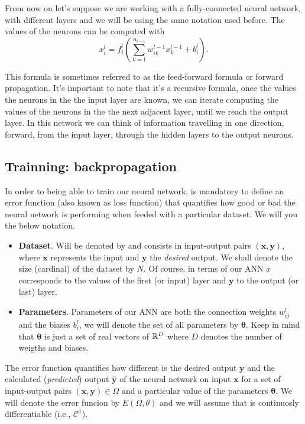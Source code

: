 From now on let's suppose we are working with a fully-connected neural network,
with different layers and we will be using the same notation used before. The
values of the neurons can be computed with
\begin{equation}
  x_i^l = f_i^l \left( \sum_{k=1}^{n_{l-1}} w_{ik}^{l-1} x_{k}^{l-1} + b_i^l \right).
\end{equation}

This formula is sometimes referred to as the feed-forward formula or forward
propagation. It's important to note that it's a recursive formula, once the
values the neurons in the the input layer are known, we can iterate computing
the values of the neurons in the the next adjacent layer, until we reach the
output layer. In this network we can think of information travelling in one
direction, forward, from the input layer, through the hidden layers to the
output neurons.

\subsection{Trainning: backpropagation}
\label{sec:backward}

In order to being able to train our neural network, is mandatory to define an
error function (also known as loss function) that quantifies how good or bad
the neural network is performing when feeded with a particular dataset. We will
you the below notation.
\begin{itemize}
  \item \textbf{Dataset}. Will be denoted by and consists in input-output pairs
  \((\mathbf{x}, \mathbf{y})\), where \(\mathbf{x}\) represents the input and
  \(\mathbf{y}\) the \emph{desired} output. We shall denote the size (cardinal)
  of the dataset by \(N\). Of course, in terms of our ANN \(x\) corresponds to
  the values of the first (or input) layer and \(\mathbf{y}\) to the output (or
  last) layer.
  \item \textbf{Parameters}. Parameters of our ANN are both the connection
  weights \(w_{ij}^l\) and the biases \(b_i^l\), we will denote the set of all
  parameters by \(\bm{\theta}\). Keep in mind that \(\bm{\theta}\) is just a
  set of real vectors of \(\mathbb{R}^D\) where \(D\) denotes the number of weigths and
  biases.
\end{itemize}

The error function quantifies how different is the desired output
\(\mathbf{y}\) and the calculated (\emph{predicted}) output
\(\mathbf{\hat{y}}\) of the neural network on input \(\mathbf{x}\) for a set of
input-output pairs \((\mathbf{x}, \mathbf{y}) \in \Omega\) and a particular
value of the parameters \(\bm{\theta}\). We will denote the error funcion by
\(E(\Omega, \theta)\) and we will assume that is continuosly differentiable
(i.e., \(\mathcal{C}^1\)).


